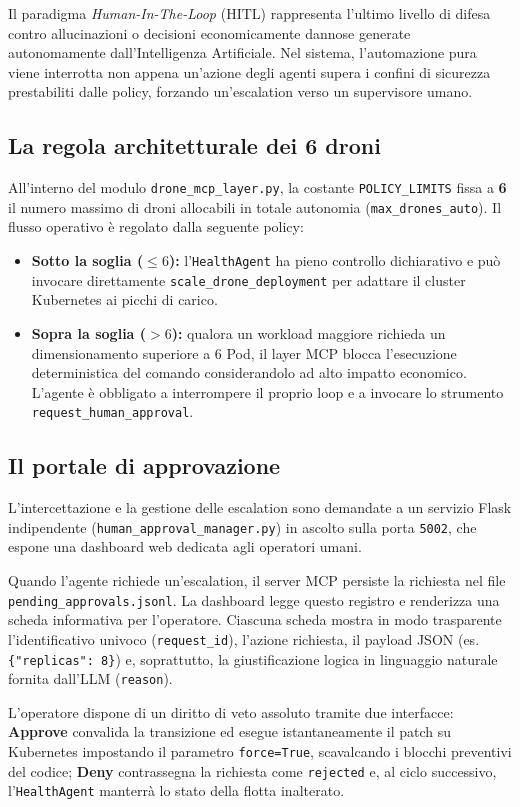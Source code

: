 Il paradigma \textit{Human-In-The-Loop} (HITL) rappresenta l'ultimo livello di difesa contro allucinazioni o decisioni economicamente dannose generate autonomamente dall'Intelligenza Artificiale. Nel sistema, l'automazione pura viene interrotta non appena un'azione degli agenti supera i confini di sicurezza prestabiliti dalle policy, forzando un'escalation verso un supervisore umano.

\subsection*{La regola architetturale dei 6 droni}

All'interno del modulo \texttt{drone\_mcp\_layer.py}, la costante \texttt{POLICY\_LIMITS} fissa a \textbf{6} il numero massimo di droni allocabili in totale autonomia (\texttt{max\_drones\_auto}). Il flusso operativo è regolato dalla seguente policy:

\begin{itemize}
    \item \textbf{Sotto la soglia ($\le 6$):} l'\texttt{HealthAgent} ha pieno controllo dichiarativo e può invocare direttamente \texttt{scale\_drone\_deployment} per adattare il cluster Kubernetes ai picchi di carico.
    \item \textbf{Sopra la soglia ($> 6$):} qualora un workload maggiore richieda un dimensionamento superiore a 6 Pod, il layer MCP blocca l'esecuzione deterministica del comando considerandolo ad alto impatto economico. L'agente è obbligato a interrompere il proprio loop e a invocare lo strumento \texttt{request\_human\_approval}.
\end{itemize}

\subsection*{Il portale di approvazione}

L'intercettazione e la gestione delle escalation sono demandate a un servizio Flask indipendente (\texttt{human\_approval\_manager.py}) in ascolto sulla porta \texttt{5002}, che espone una dashboard web dedicata agli operatori umani.

Quando l'agente richiede un'escalation, il server MCP persiste la richiesta nel file \texttt{pending\_approvals.jsonl}. La dashboard legge questo registro e renderizza una scheda informativa per l'operatore. Ciascuna scheda mostra in modo trasparente l'identificativo univoco (\texttt{request\_id}), l'azione richiesta, il payload JSON (es. \texttt{\{"replicas": 8\}}) e, soprattutto, la giustificazione logica in linguaggio naturale fornita dall'LLM (\texttt{reason}).

L'operatore dispone di un diritto di veto assoluto tramite due interfacce: \textbf{Approve} convalida la transizione ed esegue istantaneamente il patch su Kubernetes impostando il parametro \texttt{force=True}, scavalcando i blocchi preventivi del codice; \textbf{Deny} contrassegna la richiesta come \texttt{rejected} e, al ciclo successivo, l'\texttt{HealthAgent} manterrà lo stato della flotta inalterato.
